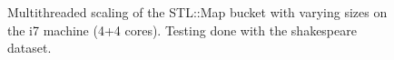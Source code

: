 \begin{landscape}
\begin{figure}[!h]
{        }
        \label{fig:ts_i7_shake_map}
        \caption{Multithreaded scaling of the STL::Map bucket with varying sizes on the
        i7 machine (4+4 cores). Testing done with the shakespeare dataset.}
    \end{figure}
    \begin{figure}[!h]
\end{figure}
\end{landscape}
